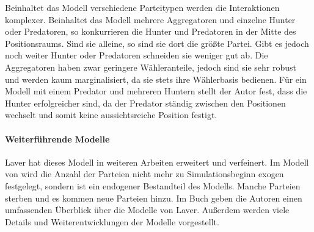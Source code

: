 Beinhaltet das Modell verschiedene Parteitypen werden die Interaktionen komplexer. Beinhaltet das Modell mehrere Aggregatoren und einzelne Hunter oder Predatoren, so konkurrieren die Hunter und Predatoren in der Mitte des Positionsraums. Sind sie alleine, so sind sie dort die größte Partei. Gibt es jedoch noch weiter Hunter oder Predatoren schneiden sie weniger gut ab. Die Aggregatoren haben zwar geringere Wähleranteile, jedoch sind sie sehr robust und werden kaum marginalisiert, da sie stets ihre Wählerbasis bedienen.
Für ein Modell mit einem Predator und mehreren Huntern stellt der Autor fest, dass die Hunter erfolgreicher sind, da der Predator ständig zwischen den Positionen wechselt und somit keine aussichtsreiche Position festigt. \citep[S.\,271-274]{laver2005policy}

\paragraph{Weiterführende Modelle}
Laver hat dieses Modell in weiteren Arbeiten erweitert und verfeinert.
Im Modell von \citet{laver2007endogenousParties} wird die Anzahl der Parteien nicht mehr zu Simulationsbeginn exogen festgelegt, sondern ist ein endogener Bestandteil des Modells.
Manche Parteien sterben und es kommen neue Parteien hinzu.
Im Buch \citet{laver2011party} geben die Autoren einen umfassenden Überblick über die Modelle von Laver. Außerdem werden viele Details und Weiterentwicklungen der Modelle vorgestellt.